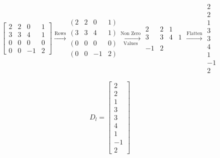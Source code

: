 \documentclass[12pt]{article}
\begin{document}
\begin{equation*}
\begin{bmatrix}
2 & 2 & 0 & 1\\
3 & 3 & 4 & 1\\
0 & 0 & 0 & 0\\
0 & 0 & -1 & 2
\end{bmatrix}\xrightarrow[\text{}]{\text{Rows}}\begin{matrix}
( \ 2 & 2 & 0 & 1\ )\\
( \ 3 & 3 & 4 & 1\ )\\
( \ 0 & 0 & 0 & 0\ )\\
( \ 0 & 0 & -1 & 2\ )
\end{matrix}\xrightarrow[\text{Values}]{\text{Non Zero}}\begin{matrix}
2 & 2 & 1 & \\
3 & 3 & 4 & 1\\
 &  &  & \\
-1 & 2 &  & 
\end{matrix}\xrightarrow{\text{Flatten}}
\begin{matrix}
2\\
2\\
1\\
3\\
3\\
4\\
1\\
-1\\
2
\end{matrix}
\end{equation*}
\begin{center}
\begin{equation*}
	D_l = 
	\begin{bmatrix}
	2\\
	2\\
	1\\
	3\\
	3\\
	4\\
	1\\
	-1\\
	2
	\end{bmatrix}
\end{equation*}
\end{center}
\end{document}
